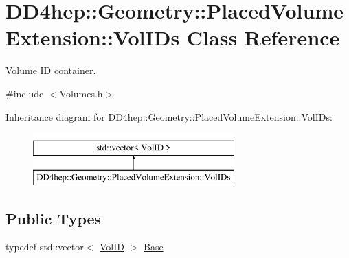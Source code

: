 \hypertarget{class_d_d4hep_1_1_geometry_1_1_placed_volume_extension_1_1_vol_i_ds}{}\section{D\+D4hep\+:\+:Geometry\+:\+:Placed\+Volume\+Extension\+:\+:Vol\+I\+Ds Class Reference}
\label{class_d_d4hep_1_1_geometry_1_1_placed_volume_extension_1_1_vol_i_ds}


\hyperlink{class_d_d4hep_1_1_geometry_1_1_volume}{Volume} ID container.  




{\ttfamily \#include $<$Volumes.\+h$>$}

Inheritance diagram for D\+D4hep\+:\+:Geometry\+:\+:Placed\+Volume\+Extension\+:\+:Vol\+I\+Ds\+:\begin{figure}[H]
\begin{center}
\leavevmode
\includegraphics[height=2.000000cm]{class_d_d4hep_1_1_geometry_1_1_placed_volume_extension_1_1_vol_i_ds}
\end{center}
\end{figure}
\subsection*{Public Types}
\begin{DoxyCompactItemize}
\item 
typedef std\+::vector$<$ \hyperlink{class_d_d4hep_1_1_geometry_1_1_placed_volume_extension_a9f0e95dedfbda206b118af985b2ed473}{Vol\+ID} $>$ \hyperlink{class_d_d4hep_1_1_geometry_1_1_placed_volume_extension_1_1_vol_i_ds_a9328d0964ef092fd108679b2ecafd5b7}{Base}
\end{DoxyCompactItemize}
